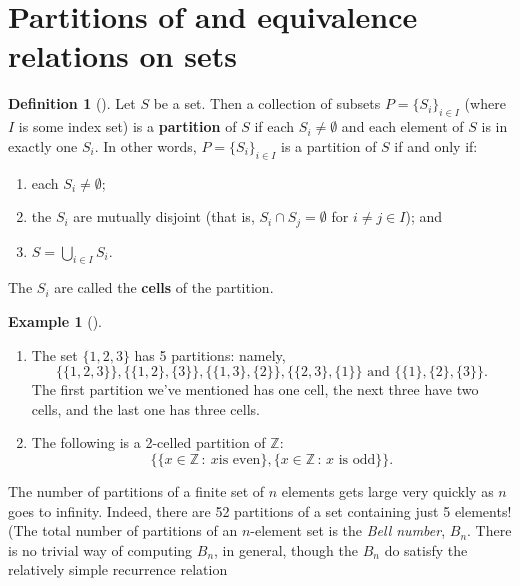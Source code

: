 \documentclass[10pt,]{book}
\newcommand{\terminology}[1]{\textbf{#1}}
\theoremstyle{plain}
\theoremstyle{definition}
\newtheorem{definition}[theorem]{Definition}
\theoremstyle{definition}
\theoremstyle{definition}
\newtheorem{example}[theorem]{Example}
\theoremstyle{definition}
\numberwithin{equation}{section}
\def\Z{\mathbb{Z}}
\begin{document}
\section[{Partitions of and equivalence relations on sets}]{Partitions of and equivalence relations on sets}\label{section-22}
\begin{definition}[{}]\label{definition-56}
Let \(S\) be a set. Then a collection of subsets \(P=\{S_i\}_{i\in I}\) (where \(I\) is some index set) is a \terminology{partition} of \(S\) if each \(S_i \neq \emptyset\) and each element of \(S\) is in exactly one \(S_i\). In other words, \(P=\{S_i\}_{i\in I}\) is a partition of \(S\) if and only if: \leavevmode%
\begin{enumerate}
\item\hypertarget{li-383}{}each \(S_i\neq \emptyset\);%
\item\hypertarget{li-384}{}the \(S_i\) are mutually disjoint (that is, \(S_i\cap S_j =
\emptyset\) for \(i\neq j \in I\)); and%
\item\hypertarget{li-385}{}\(S=\bigcup_{i\in I}S_i\).%
\end{enumerate}
%
\par
The \(S_i\) are called the \terminology{cells} of the partition.%
\end{definition}
\begin{example}[]\label{example-64}
\leavevmode%
\begin{enumerate}
\item\hypertarget{li-386}{}The set \(\{1,2,3\}\) has 5 partitions: namely,%
\begin{equation*}
\{\{1,2,3\}\},\{\{1,2\},\{3\}\}, \{\{1,3\},\{2\}\},\{\{2,3\},\{1\}\} \text{ and }  \{\{1\},\{2\},\{3\}\}.
\end{equation*}
The first partition we've mentioned has one cell, the next three have two cells, and the last one has three cells.%
\item\hypertarget{li-387}{}The following is a 2-celled partition of \(\Z\):%
\begin{equation*}
\{\{x\in \Z\,:\ x \text{
is even} \},\{x\in \Z\,:\, x\text{ is odd} \}\}.
\end{equation*}
%
\end{enumerate}
%
\end{example}
The number of partitions of a finite set of \(n\) elements gets large very quickly as \(n\) goes to infinity. Indeed, there are 52 partitions of a set containing just 5 elements! (The total number of partitions of an \(n\)-element set is the \emph{Bell number}, \(B_n\). There is no trivial way of computing \(B_n\), in general, though the \(B_n\) do satisfy the relatively simple recurrence relation%
\end{document}
